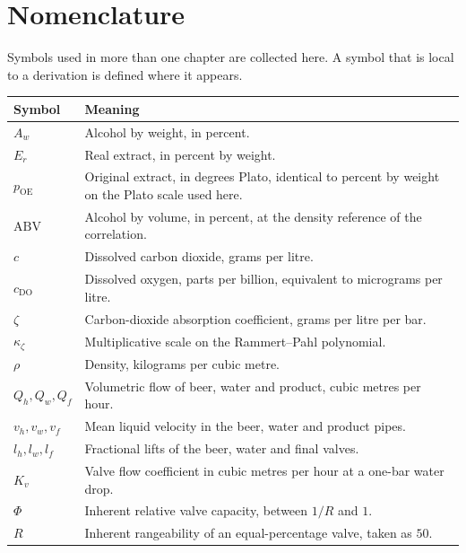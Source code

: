 \documentclass[12pt,a4paper]{report}
\numberwithin{equation}{chapter}
\numberwithin{figure}{chapter}
\numberwithin{table}{chapter}
\begin{document}
\begin{abstract}
The study is a reproducible dynamic simulation of an \SI{80}{\litre} mix volume at \SI{20}{\cubic\metre\per\hour}. It is a design and estimation result, not a brewery trial.
\end{abstract}

\tableofcontents
\listoffigures
\listoftables

\chapter*{Nomenclature}
\noindent
Symbols used in more than one chapter are collected here. A symbol that is local to a derivation is defined where it appears.

\begin{longtable}{@{}lp{}@{}}
\toprule
Symbol & Meaning \\
\midrule
\endhead
$A_w$ & Alcohol by weight, in percent. \\
$E_r$ & Real extract, in percent by weight. \\
$p_{\mathrm{OE}}$ & Original extract, in degrees Plato, identical to percent by weight on the Plato scale used here. \\
$\mathrm{ABV}$ & Alcohol by volume, in percent, at the density reference of the correlation. \\
$c$ & Dissolved carbon dioxide, grams per litre. \\
$c_{\mathrm{DO}}$ & Dissolved oxygen, parts per billion, equivalent to micrograms per litre. \\
$\zeta$ & Carbon-dioxide absorption coefficient, grams per litre per bar. \\
$\kappa_{\zeta}$ & Multiplicative scale on the Rammert--Pahl polynomial. \\
$\rho$ & Density, kilograms per cubic metre. \\
$Q_h,Q_w,Q_f$ & Volumetric flow of beer, water and product, cubic metres per hour. \\
$v_h,v_w,v_f$ & Mean liquid velocity in the beer, water and product pipes. \\
$l_h,l_w,l_f$ & Fractional lifts of the beer, water and final valves. \\
$K_v$ & Valve flow coefficient in cubic metres per hour at a one-bar water drop. \\
$\Phi$ & Inherent relative valve capacity, between $1/R$ and $1$. \\
$R$ & Inherent rangeability of an equal-percentage valve, taken as $50$. \\

\end{longtable}
\end{document}
